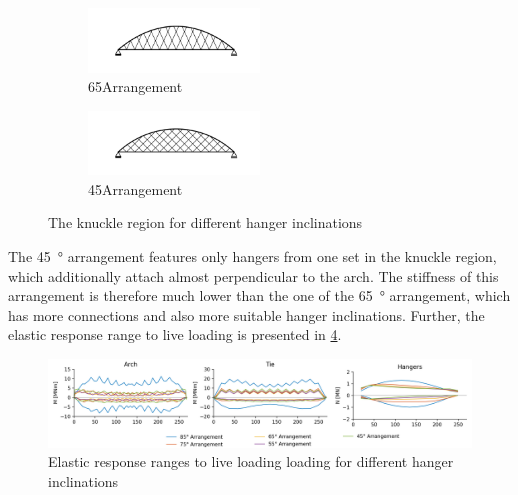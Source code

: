 \begin{figure}[H]
\centering
\begin{subfigure}{0.5\textwidth}
    \centering
    \includegraphics[trim={40 25 189 40},clip, width=0.5\textwidth]{calculations/parallel arrangement comparison/arrangement_65.png}
    \caption{65\degree Arrangement}
    \label{fig:arrangements_65}
\end{subfigure}%
\begin{subfigure}{.5\textwidth}
    \centering
    \includegraphics[trim={40 25 189 40},clip, width=0.5\textwidth]{calculations/parallel arrangement comparison/arrangement_45.png}
    \caption{45\degree Arrangement}
    \label{fig:arrangements_45}
\end{subfigure}
\caption{The knuckle region for different hanger inclinations}
\label{fig:arrangements}
\end{figure}

The \SI{45}{\degree} arrangement features only hangers from one set in the knuckle region, which additionally attach almost perpendicular to the arch. The stiffness of this arrangement is therefore much lower than the one of the \SI{65}{\degree} arrangement, which has more connections and also more suitable hanger inclinations. Further, the elastic response range to live loading is presented in \cref{fig:inclination_live}.

\begin{figure}[H]
    \centering
    \includegraphics[trim={1cm 0 1cm 0},clip, width=\textwidth]{calculations/parallel arrangement comparison/live loading_plot.png}
    \caption{Elastic response ranges to live loading loading for different hanger inclinations}
    \label{fig:inclination_live}
\end{figure}

